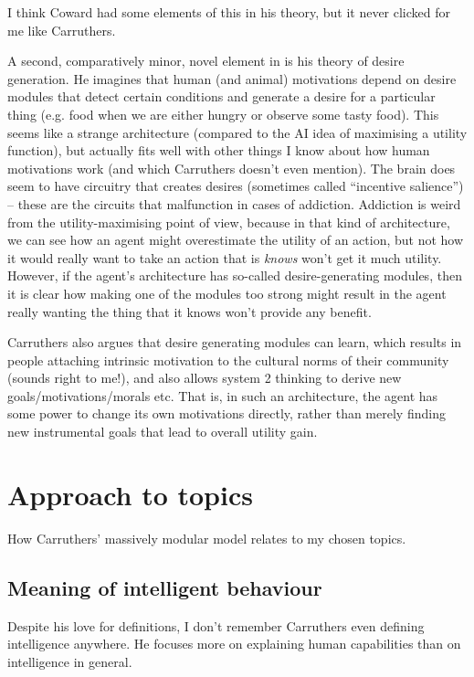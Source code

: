 \documentclass[10pt,a4paper]{article}
\newcommand{\nquote}[1]{``{#1}''}
\begin{document}
I think Coward had some elements of this in his theory, but it never clicked for me like Carruthers.

A second, comparatively minor, novel element in \cite{carruthers} is his theory of desire generation. He imagines that human (and animal) motivations depend on desire modules that detect certain conditions and generate a desire for a particular thing (e.g. food when we are either hungry or observe some tasty food). This seems like a strange architecture (compared to the AI idea of maximising a utility function), but actually fits well with other things I know about how human motivations work (and which Carruthers doesn't even mention). The brain does seem to have circuitry that creates desires (sometimes called \nquote{incentive salience}) -- these are the circuits that malfunction in cases of addiction. Addiction is weird from the utility-maximising point of view, because in that kind of architecture, we can see how an agent might overestimate the utility of an action, but not how it would really want to take an action that is \emph{knows} won't get it much utility. However, if the agent's architecture has so-called desire-generating modules, then it is clear how making one of the modules too strong might result in the agent really wanting the thing that it knows won't provide any benefit.

Carruthers also argues that desire generating modules can learn, which results in people attaching intrinsic motivation to the cultural norms of their community (sounds right to me!), and also allows system 2 thinking to derive new goals/motivations/morals etc. That is, in such an architecture, the agent has some power to change its own motivations directly, rather than merely finding new instrumental goals that lead to overall utility gain.

\section{Approach to topics}
How Carruthers' massively modular model relates to my chosen topics.

\subsection{Meaning of intelligent behaviour}
Despite his love for definitions, I don't remember Carruthers even defining intelligence anywhere. He focuses more on explaining human capabilities than on intelligence in general.
\end{document}
